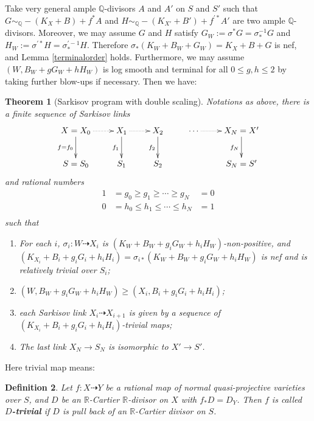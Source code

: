 \documentclass[11pt]{amsart}
\newtheorem{defn}{Definition}[section]
\newtheorem{thm}[defn]{Theorem}
\begin{document}
Take  very general ample $\mathbb{Q}$-divisors $ A $ and $ A' $ on $ S $ and $ S' $ such that $ G\sim_{\mathbb{Q}}-(K_X+B)+f^*A $ and $ H\sim_{\mathbb{Q}}-(K_{X'}+B')+f^{'*}A' $ are two ample $\mathbb{Q}$-divisors. Moreover, we may assume $ G $ and $ H $ satisfy $G_{W}:= \sigma^*G=\sigma^{-1}_*G $ and $ H_{W}:=\sigma^{'*}H=\sigma^{'-1}_*H $. Therefore $\sigma_{*}(K_{W}+B_{W}+G_{W})=K_{X}+B+G$ is nef, and Lemma \ref{terminalorder} holds.
Furthermore, we may assume $(W,B_W+gG_W+hH_W)$ is log smooth and terminal for all $0\leqslant g,h\leqslant 2$ by taking further blow-ups if necessary.
Then we have:
\begin{thm}[Sarkisov program with double scaling]\label{main2}
  \cite[Claim 13.12]{haconMinimalModelProgram2012}
Notations as above, there is a finite sequence of Sarkisov links
\[
  \xymatrix{
    X=X_0\ar@{.>}[r]\ar[d]_{f=f_{0}}&X_{1}\ar@{.>}[r]\ar[d]_{f_{1}}& X_{2}\ar[d]_{f_{2}} &\cdots\ar@{.>}[r]&X_N=X'\ar[d]_{f_{N}} \\
    S=S_{0}&S_{1} &S_{2}&&S_N=S'
  }
\]
and rational numbers
\[
  \begin{aligned}
    1&=g_0\geqslant g_1 \geqslant \cdots \geqslant g_N&=0\\
    0&=h_0\leqslant h_{1} \leqslant \cdots \leqslant h_N&=1\\
  \end{aligned}
\]
such that 
\begin{enumerate}
  \item For each $i$, $\sigma_i:W\dashrightarrow  X_{i}$ is $(K_{W}+B_{W}+g_{i}G_{W}+h_{i}H_{W})$-non-positive, and $(K_{X_{i}}+B_{i}+g_{i}G_{i}+h_{i}H_{i})=\sigma_{i*}(K_{W}+B_{W}+g_{i}G_{W}+h_{i}H_{W})$ is nef and is relatively trivial over $S_{i}$;
  \item $(W,B_{W}+g_{i}G_{W}+h_{i}H_{W})\geqslant (X_{i},B_{i}+g_{i}G_{i}+h_{i}H_{i})$;
  \item each Sarkisov link $X_{i}\dashrightarrow X_{i+1}$ is given by a sequence of $(K_{X_{i}}+B_{i}+g_{i}G_{i}+h_{i}H_{i})$-trivial maps;
    \item  The last link $X_{N} \to S_{N}$ is isomorphic to $X'\to S'$.
\end{enumerate}
\end{thm}
Here trivial map means:
\begin{defn}\label{rivialmap}
  \cite[\S 13.2]{haconMinimalModelProgram2012} Let $f:X\dashrightarrow Y$ be a rational map of normal quasi-projective varieties over $S$, and $D$ be an $\mathbb{R}$-Cartier $\mathbb{R}$-divisor  on $X$ with $f_*D=D_Y$. Then $f$ is called \textbf{$D$-trivial} if $D$ is pull back of an $\mathbb{R}$-Cartier divisor on $S$.
\end{defn}
\end{document}
